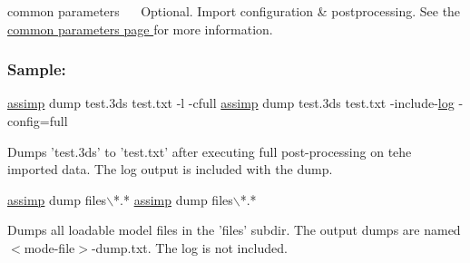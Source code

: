 {\ttfamily  common parameters~\newline
}~\newline
 Optional. Import configuration \& postprocessing. See the \hyperlink{common}{common parameters page } for more information. 





\subsubsection*{Sample\+:}


\begin{DoxyCode}
\hyperlink{namespaceassimp}{assimp} dump test.3ds test.txt -l -cfull
\hyperlink{namespaceassimp}{assimp} dump test.3ds test.txt -include-\hyperlink{structlog}{log} -config=full
\end{DoxyCode}


Dumps 'test.\+3ds' to 'test.\+txt' after executing full post-\/processing on tehe imported data. The log output is included with the dump.


\begin{DoxyCode}
\hyperlink{namespaceassimp}{assimp} dump files\(\backslash\)*.*
\hyperlink{namespaceassimp}{assimp} dump files\(\backslash\)*.* 
\end{DoxyCode}


Dumps all loadable model files in the 'files' subdir. The output dumps are named {\ttfamily $<$mode-\/file$>$-\/dump.\+txt}. The log is not included. 
